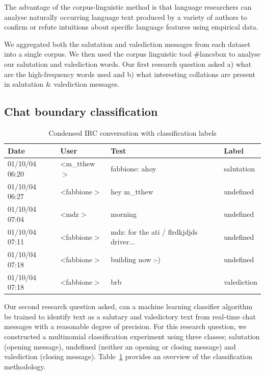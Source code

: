 The advantage of the corpus-linguistic method is that language researchers can analyse naturally occurring language text produced by a variety of authors to confirm or refute intuitions about specific language features using empirical data.

We aggregated both the salutation and valediction messages from each dataset into a single corpus. We then used the corpus linguistic tool \#lancsbox \cite{lancsbox} to analyse our salutation and valediction words. Our first research question asked a) what are the high-frequency words used and b) what interesting collations are present in salutation \& valediction messages.

\subsection{Chat boundary classification}

\begin {table}[]
\caption {Condensed IRC conversation with classification labels} 
\label{tab:chap7_study2_tab6}
\begin{center}
\begin{tabular}{| p{3.2cm} | p{2.5cm} | p{3cm} | p{2cm} |} \hline \textbf{Date} & \textbf{User} & \textbf{Test} & \textbf{Label} 
\\  \hline 01/10/04 06:20 & \textless m\_tthew$>$ & fabbione: ahoy & salutation
\\  \hline 01/10/04 06:27 & \textless fabbione$>$ & hey m\_tthew & undefined
\\ \hline 01/10/04 07:04 & \textless mdz$>$ & morning & undefined
\\  \hline 01/10/04 07:11 & \textless fabbione$>$ & mdz: for the ati / flrdkjdjds driver... & undefined
\\  \hline 01/10/04 07:18 & \textless fabbione$>$ & building now :-) & undefined 
\\  \hline 01/10/04 07:18 & \textless fabbione$>$ & brb & valediction 
\\ \hline
\end{tabular}
\end{center}
\end{table}

Our second research question asked, can a machine learning classifier algorithm be trained to identify text as a salutary and valedictory text from real-time chat messages with a reasonable degree of precision. For this research question, we constructed a multinomial classification experiment using three classes; salutation (opening message), undefined (neither an opening or closing message) and valediction (closing message). Table~\ref{tab:chap7_study2_tab6} provides an overview of the classification methodology.


